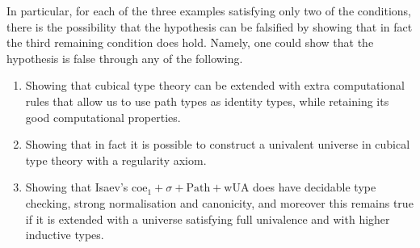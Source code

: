 \documentclass[a4paper]{amsart}
\theoremstyle{definition}
\begin{document}
In particular, for each of the three examples satisfying only two of
the conditions, there is the possibility that the hypothesis can be
falsified by showing that in fact the third remaining condition does
hold. Namely, one could show that the hypothesis is false through any
of the following.
\begin{enumerate}
\item Showing that cubical type theory can be extended with extra
  computational rules that allow us to use path types as identity types,
  while retaining its good computational properties.
\item Showing that in fact it is possible to construct a univalent
  universe in cubical type theory with a regularity axiom.
\item Showing that Isaev's
  $\mathrm{coe}_1 + \sigma + \mathrm{Path} + \mathrm{wUA}$ does have
  decidable type checking, strong normalisation and canonicity, and
  moreover this remains true if it is extended with a universe
  satisfying full univalence and with higher inductive types.
\end{enumerate}


{}
\end{document}
